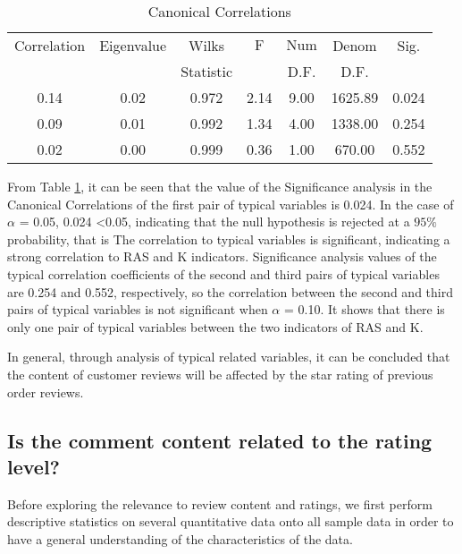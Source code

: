 \documentclass{mcmthesis}
\begin{document}
\begin{table}[h]
	\centering
	\caption{Canonical Correlations}\label{q4b2}
	\begin{tabular}{ccccccc}
		& & & \\
		\toprule  Correlation & Eigenvalue & Wilks  & $\mathrm{F}$ & $\mathrm{Num} $ & Denom  & Sig. \\
		&  &  Statistic &  & D.F. &  D.F. &  \\
		\midrule  0.14 & 0.02 & 0.972 & 2.14 & 9.00 & 1625.89 & 0.024 \\
		0.09 & 0.01 & 0.992 & 1.34 & 4.00 & 1338.00 & 0.254 \\
		0.02 & 0.00 & 0.999 & 0.36 & 1.00 & 670.00 & 0.552 \\
	\bottomrule
	\end{tabular}
\end{table}

From Table \ref{q4b2}, it can be seen that the value of the Significance analysis in the Canonical Correlations of the first pair of typical variables is 0.024. In the case of \(\alpha\) = 0.05, 0.024 <0.05, indicating that the null hypothesis is rejected at a \(95 \%\) probability, that is The correlation to typical variables is significant, indicating a strong correlation to RAS and K indicators. Significance analysis values of the typical correlation coefficients of the second and third pairs of typical variables are 0.254 and 0.552, respectively, so the correlation between the second and third pairs of typical variables is not significant when \(\alpha\) = 0.10. It shows that there is only one pair of typical variables between the two indicators of RAS and K.

In general, through analysis of typical related variables, it can be concluded that the content of customer reviews will be affected by the star rating of previous order reviews.

\subsection{ Is the comment content  related to the rating level?}

Before exploring the relevance to review content and ratings, we first perform descriptive statistics on several quantitative data onto all sample data in order to have a general understanding of the characteristics of the data.
\end{document}
